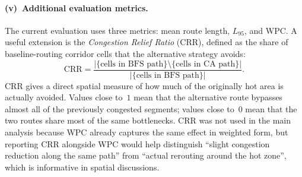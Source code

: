 \documentclass[12pt,a4paper]{article}
\begin{document}
\paragraph{(v)~Additional evaluation metrics.}
The current evaluation uses three metrics: mean route length, $L_{95}$,
and WPC. A useful extension is the \emph{Congestion Relief Ratio}
(CRR), defined as the share of baseline-routing corridor cells that
the alternative strategy avoids:
\[
  \mathrm{CRR} = \frac{|\{\text{cells in BFS path}\} \setminus \{\text{cells in CA path}\}|}
                       {|\{\text{cells in BFS path}\}|}.
\]
CRR gives a direct spatial measure of how much of the originally hot
area is actually avoided. Values close to~$1$ mean that the
alternative route bypasses almost all of the previously congested
segments; values close to~$0$ mean that the two routes share most of
the same bottlenecks. CRR was not used in the main analysis because
WPC already captures the same effect in weighted form, but reporting
CRR alongside WPC would help distinguish ``slight congestion
reduction along the same path'' from ``actual rerouting around the
hot zone'', which is informative in spatial discussions.
\end{document}
